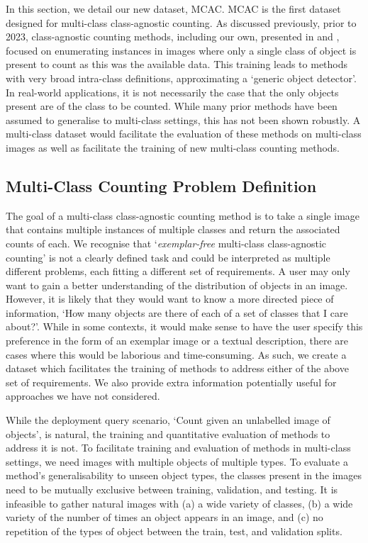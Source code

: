 \documentclass[../thesis.tex]{subfiles}
\begin{document}
In this section, we detail our new dataset, MCAC.
MCAC is the first dataset designed for multi-class class-agnostic counting. 
As discussed previously, prior to 2023, class-agnostic counting methods, including our own, presented in  and \citet{ltcahobley},  focused on enumerating instances in images where only a single class of object is present to count as this was the available data. 
This training leads to methods with very broad intra-class definitions, approximating a `generic object detector'.
In real-world applications, it is not necessarily the case that the only objects present are of the class to be counted.
While many prior methods have been assumed to generalise to multi-class settings, this has not been shown robustly.
A multi-class dataset would facilitate the evaluation of these methods on multi-class images as well as facilitate the training of new multi-class counting methods.



\subsection{Multi-Class Counting Problem Definition}
The goal of a multi-class class-agnostic counting method is to take a single image that contains multiple instances of multiple classes and return the associated counts of each.
We recognise that `\textit{exemplar-free} multi-class class-agnostic counting' is not a clearly defined task and could be interpreted as multiple different problems, each fitting a different set of requirements.
A user may only want to gain a better understanding of the distribution of objects in an image. 
However, it is likely that they would want to know a more directed piece of information, `How many objects are there of each of a set of classes that I care about?'. 
While in some contexts, it would make sense to have the user specify this preference in the form of an exemplar image or a textual description, there are cases where this would be laborious and time-consuming.
As such, we create a dataset which facilitates the training of methods to address either of the above set of requirements. We also provide extra information potentially useful for approaches we have not considered.


While the deployment query scenario, `Count given an unlabelled image of objects', is natural, the training and quantitative evaluation of methods to address it is not.
To facilitate training and evaluation of methods in multi-class settings, we need images with multiple objects of multiple types. 
To evaluate a method's generalisability to unseen object types, the classes present in the images need to be mutually exclusive between training, validation, and testing.
It is infeasible to gather natural images with (a) a wide variety of classes, (b) a wide variety of the number of times an object appears in an image, and (c) no repetition of the types of object between the train, test, and validation splits. 
\end{document}
